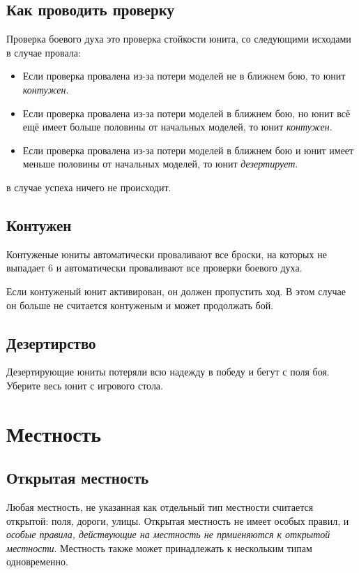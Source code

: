\documentclass[twocolumn]{article}
\begin{document}
\subsection{Как проводить проверку}
Проверка боевого духа это проверка стойкости юнита, со следующими исходами в случае провала:
\begin{itemize}
    \item Если проверка провалена из-за потери моделей не в ближнем бою, то юнит \emph{контужен}.
    \item Если проверка провалена из-за потери моделей в ближнем бою, но юнит всё ещё имеет больше половины от начальных моделей, то юнит \emph{контужен}.
    \item Если проверка провалена из-за потери моделей в ближнем бою и юнит имеет меньше половины от начальных моделей, то юнит \emph{дезертирует}.
\end{itemize}
в случае успеха ничего не происходит.

\subsection{Контужен}
Контуженые юниты автоматически проваливают все броски, на которых не выпадает 6 и автоматически проваливают все проверки боевого духа.

Если контуженый юнит активирован, он должен пропустить ход. В этом случае он больше не считается контуженым и может продолжать бой.

\subsection{Дезертирство}
Дезертирующие юниты потеряли всю надежду в победу и бегут с поля боя. Уберите весь юнит с игрового стола.

\newpage

\section{Местность}
\subsection{Открытая местность}
Любая местность, не указанная как отдельный тип местности считается открытой: поля, дороги, улицы. Открытая местность не имеет особых правил, и \emph{особые правила, действующие на местность не прмиеняются к открытой местности}. Местность также может принадлежать к нескольким типам одновременно.
\end{document}
